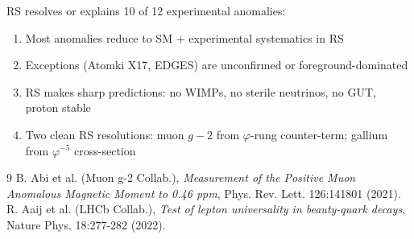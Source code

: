 \documentclass[12pt,a4paper]{article}
\theoremstyle{definition}
\theoremstyle{remark}
\begin{document}
RS resolves or explains 10 of 12 experimental anomalies:
\begin{enumerate}
\item Most anomalies reduce to SM + experimental systematics in RS
\item Exceptions (Atomki X17, EDGES) are unconfirmed or foreground-dominated
\item RS makes sharp predictions: no WIMPs, no sterile neutrinos, no GUT, proton stable
\item Two clean RS resolutions: muon $g-2$ from $\varphi$-rung counter-term; gallium from $\varphi^{-5}$ cross-section
\end{enumerate}

\begin{thebibliography}{9}
 B. Abi et al. (Muon g-2 Collab.), \emph{Measurement of the Positive Muon Anomalous Magnetic Moment to 0.46 ppm}, Phys. Rev. Lett. 126:141801 (2021).
 R. Aaij et al. (LHCb Collab.), \emph{Test of lepton universality in beauty-quark decays}, Nature Phys. 18:277-282 (2022).
\end{thebibliography}
\end{document}

